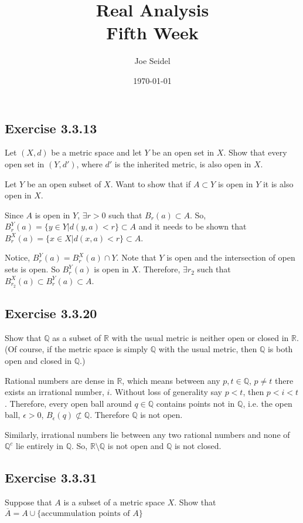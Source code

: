 \documentclass{tufte-book}
\title{Real Analysis\\Fifth Week }
\author{Joe Seidel}
\date{\today}
\theoremstyle{mytheoremstyle}
\theoremstyle{mylemstyle}
\theoremstyle{mydefstyle}
\begin{document}
\maketitle
{}
\newpage
{}

\subsection{Exercise 3.3.13}
Let $(X,d)$ be a metric space and let $Y$ be an open set in $X$.  Show that every open set in $(Y,d')$, where $d'$ is the inherited metric, is also open in $X$.

Let $Y$ be an open subset of $X$.  Want to show that if $A \subset Y$ is open in $Y$ it is also open in $X$.

Since $A$ is open in $Y$, $\exists r>0$ such that $B_r(a) \subset A$. So, $B_r^Y(a) = \{y \in Y | d(y,a) < r\} \subset A$ and it needs to be shown that $B_r^X(a) = \{x \in X|d(x,a) <r\} \subset A$.

Notice, $B_r^Y(a) = B_r^X(a) \cap Y$.  Note that $Y$ is open and the intersection of open sets is open.  So $B_r^Y(a)$ is open in $X$. Therefore, $\exists r_2$ such that $B_{r_2}^X(a) \subset B_r^Y(a) \subset A$.

\subsection{Exercise 3.3.20}
Show that $\mathbb{Q}$ as a subset of $\mathbb{R}$ with the usual metric is neither open or closed in $\mathbb{R}$.  (Of course, if the metric space is simply $\mathbb{Q}$ with the usual metric, then $\mathbb{Q}$ is both open and closed in $\mathbb{Q}$.)

Rational numbers are dense in $\mathbb{R}$, which means between any $p,t \in \mathbb{Q}$, $p \neq t$ there exists an irrational number, $i$.  Without loss of generality say $p < t$, then $p < i < t$.  Therefore, every open ball around $q \in \mathbb{Q}$ contains points not in $\mathbb{Q}$, i.e. the open ball, $\epsilon > 0$, $B_\epsilon(q) \not\subset \mathbb{Q}$.  Therefore $\mathbb{Q}$ is not open.

Similarly, irrational numbers lie between any two rational numbers and none of $\mathbb{Q}^c$ lie entirely in $\mathbb{Q}$.  So, $\mathbb{R}\setminus\mathbb{Q}$ is not open and $\mathbb{Q}$ is not closed.

\subsection{Exercise 3.3.31}
Suppose that $A$ is a subset of a metric space $X$.  Show that $\overline{A} = A \cup \{ \text{accummulation points of }A\}$
\end{document}
